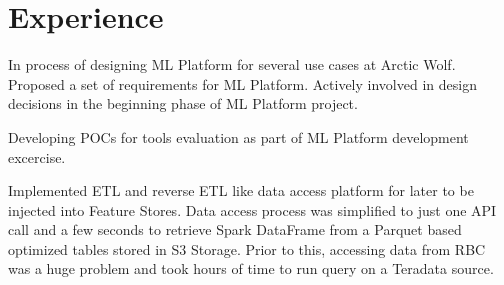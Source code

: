 \documentclass[]{deedy-resume-openfont}
\begin{document}
\begin{minipage}[t]{0.63\textwidth} 


\section{Experience}

\vspace{\topsep} %
\begin{tightemize}

\item In process of designing ML Platform for several use cases at Arctic Wolf. Proposed a set of requirements for ML Platform. Actively involved in design decisions in the beginning phase of ML Platform project.

\item Developing POCs for tools evaluation as part of ML Platform development excercise. 


\end{tightemize}
\sectionsep

\vspace{\topsep} %
\begin{tightemize}

\item Implemented ETL and reverse ETL like data access platform for later to be injected into Feature Stores. Data access process was simplified to just one API call and a few seconds to retrieve Spark DataFrame from a Parquet based optimized tables stored in S3 Storage. Prior to this, accessing data from RBC was a huge problem and took hours of time to run query on a Teradata source.



\end{tightemize}
\end{minipage}
\end{document}
